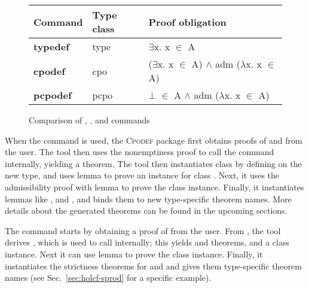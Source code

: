 \begin{figure}
\centering
\begin{tabular}{|l|l|l|}
\hline
Command & Type class & Proof obligation \\
\hline\hline
\textsf{\textbf{typedef}} & \textsf{type} & \textsf{$\exists$x. x $\in$ A} \\
\hline
\textsf{\textbf{cpodef}} & \textsf{cpo} & \textsf{($\exists$x. x $\in$ A) $\land$ adm ($\lambda$x. x $\in$ A)} \\
\hline
\textsf{\textbf{pcpodef}} & \textsf{pcpo} & \textsf{$\bot$ $\in$ A $\land$ adm ($\lambda$x. x $\in$ A)} \\
\hline
\end{tabular}
\caption{Comparison of , , and  commands}
\label{fig:holcf-cpodef}
\end{figure}

When the  command is used, the \textsc{Cpodef} package first obtains proofs of  and  from the user. The tool then uses the nonemptiness proof to call the  command internally, yielding a  theorem. The tool then instantiates class  by defining  on the new type, and uses lemma  to prove an instance for class . Next, it uses the admissibility proof with lemma  to prove the  class instance. Finally, it instantiates lemmas like ,  and , and binds them to new type-specific theorem names. More details about the generated theorems can be found in the upcoming sections.

The  command starts by obtaining a proof of  from the user.
From , the tool derives , which is used to call  internally; this yields  and  theorems, and a  class instance. Next it can use lemma  to prove the  class instance. Finally, it instantiates the strictness theorems for  and  and gives them type-specific theorem names (see Sec.~\ref{sec:holcf-sprod} for a specific example).

